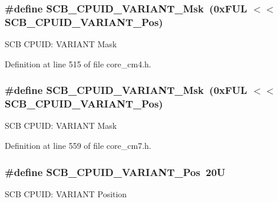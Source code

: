 \subsubsection[{\texorpdfstring{S\+C\+B\+\_\+\+C\+P\+U\+I\+D\+\_\+\+V\+A\+R\+I\+A\+N\+T\+\_\+\+Msk}{SCB_CPUID_VARIANT_Msk}}]{\setlength{\rightskip}{0pt plus 5cm}\#define S\+C\+B\+\_\+\+C\+P\+U\+I\+D\+\_\+\+V\+A\+R\+I\+A\+N\+T\+\_\+\+Msk~(0x\+F\+U\+L $<$$<$ S\+C\+B\+\_\+\+C\+P\+U\+I\+D\+\_\+\+V\+A\+R\+I\+A\+N\+T\+\_\+\+Pos)}\hypertarget{group___c_m_s_i_s___s_c_b_gad358dfbd04300afc1824329d128b99e8}{}\label{group___c_m_s_i_s___s_c_b_gad358dfbd04300afc1824329d128b99e8}
S\+CB C\+P\+U\+ID\+: V\+A\+R\+I\+A\+NT Mask 

Definition at line 515 of file core\+\_\+cm4.\+h.

\subsubsection[{\texorpdfstring{S\+C\+B\+\_\+\+C\+P\+U\+I\+D\+\_\+\+V\+A\+R\+I\+A\+N\+T\+\_\+\+Msk}{SCB_CPUID_VARIANT_Msk}}]{\setlength{\rightskip}{0pt plus 5cm}\#define S\+C\+B\+\_\+\+C\+P\+U\+I\+D\+\_\+\+V\+A\+R\+I\+A\+N\+T\+\_\+\+Msk~(0x\+F\+U\+L $<$$<$ S\+C\+B\+\_\+\+C\+P\+U\+I\+D\+\_\+\+V\+A\+R\+I\+A\+N\+T\+\_\+\+Pos)}\hypertarget{group___c_m_s_i_s___s_c_b_gad358dfbd04300afc1824329d128b99e8}{}\label{group___c_m_s_i_s___s_c_b_gad358dfbd04300afc1824329d128b99e8}
S\+CB C\+P\+U\+ID\+: V\+A\+R\+I\+A\+NT Mask 

Definition at line 559 of file core\+\_\+cm7.\+h.

\subsubsection[{\texorpdfstring{S\+C\+B\+\_\+\+C\+P\+U\+I\+D\+\_\+\+V\+A\+R\+I\+A\+N\+T\+\_\+\+Pos}{SCB_CPUID_VARIANT_Pos}}]{\setlength{\rightskip}{0pt plus 5cm}\#define S\+C\+B\+\_\+\+C\+P\+U\+I\+D\+\_\+\+V\+A\+R\+I\+A\+N\+T\+\_\+\+Pos~20U}\hypertarget{group___c_m_s_i_s___s_c_b_ga104462bd0815391b4044a70bd15d3a71}{}\label{group___c_m_s_i_s___s_c_b_ga104462bd0815391b4044a70bd15d3a71}
S\+CB C\+P\+U\+ID\+: V\+A\+R\+I\+A\+NT Position 

